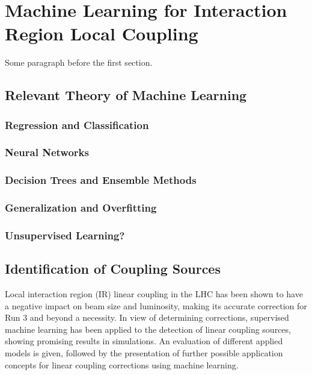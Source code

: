 \chapter{Machine Learning for Interaction Region Local Coupling} %
\label{chapter:ml_local_coupling} %


Some paragraph before the first section.


\section{Relevant Theory of Machine Learning}

\subsection{Regression and Classification}

\subsection{Neural Networks}

\subsection{Decision Trees and Ensemble Methods}

\subsection{Generalization and Overfitting}

\subsection{Unsupervised Learning?}


\section{Identification of Coupling Sources}

Local interaction region (IR) linear coupling in the LHC has been shown to have a negative impact on beam size and luminosity, making its accurate correction for Run 3 and beyond a necessity.
In view of determining corrections, supervised machine learning has been applied to the detection of linear coupling sources, showing promising results in simulations.
An evaluation of different applied models is given, followed by the presentation of further possible application concepts for linear coupling corrections using machine learning.

